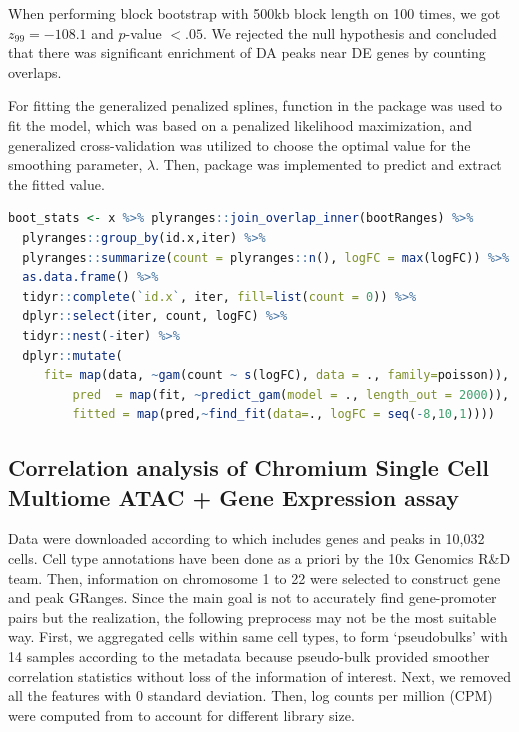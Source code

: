 \documentclass{article}
\begin{document}
When performing block bootstrap with 500kb block length on 100 times,
we got $z_{99}=-108.1$ and $\textit{p}$-value $<.05$. We rejected the
null hypothesis and concluded that there was significant enrichment of
DA peaks near DE genes by counting overlaps.

For fitting the generalized penalized splines,  function in
the  package was used to fit the model, which was based on
a penalized likelihood maximization, and generalized cross-validation
was utilized to choose the optimal value for the smoothing parameter,
$\lambda$. Then,  package was implemented to predict and
extract the fitted value.

\begin{lstlisting}[language=R]
boot_stats <- x %>% plyranges::join_overlap_inner(bootRanges) %>%
  plyranges::group_by(id.x,iter) %>%
  plyranges::summarize(count = plyranges::n(), logFC = max(logFC)) %>%
  as.data.frame() %>%
  tidyr::complete(`id.x`, iter, fill=list(count = 0)) %>%
  dplyr::select(iter, count, logFC) %>%
  tidyr::nest(-iter) %>%
  dplyr::mutate(
	 fit= map(data, ~gam(count ~ s(logFC), data = ., family=poisson)),
         pred  = map(fit, ~predict_gam(model = ., length_out = 2000)),
         fitted = map(pred,~find_fit(data=., logFC = seq(-8,10,1))))

\end{lstlisting} 

\pagebreak

\subsection{Correlation analysis of Chromium Single Cell Multiome ATAC + Gene Expression assay}

Data were downloaded according to \citet{Vignette} which includes
genes and peaks in 10,032 cells.  Cell type annotations have been done
as a priori by the 10x Genomics R\&D team.  Then, information on
chromosome 1 to 22 were selected to construct gene and peak GRanges.
Since the main goal is not to accurately find gene-promoter pairs but
the realization, the following preprocess may not be the most suitable
way.  First, we aggregated cells within same cell types, to form
‘pseudobulks’ with 14 samples according to the metadata because
pseudo-bulk provided smoother correlation statistics without loss of
the information of interest.  Next, we removed all the features with 0
standard deviation.  Then, log counts per million (CPM) were computed
from  to account for different library size.
\end{document}
